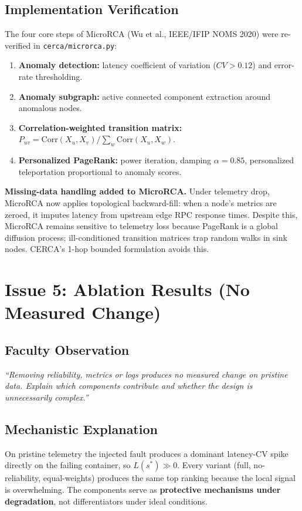 \documentclass[11pt,a4paper]{article}
\begin{document}
\subsection{Implementation Verification}
The four core steps of MicroRCA (Wu et al., IEEE/IFIP NOMS 2020) were re-verified in \texttt{cerca/microrca.py}:

\begin{enumerate}[leftmargin=1.8em,itemsep=2pt]
  \item \textbf{Anomaly detection:} latency coefficient of variation ($CV>0.12$) and error-rate thresholding.
  \item \textbf{Anomaly subgraph:} active connected component extraction around anomalous nodes.
  \item \textbf{Correlation-weighted transition matrix:} $P_{uv}=\mathrm{Corr}(X_u,X_v)/\sum_w\mathrm{Corr}(X_u,X_w)$.
  \item \textbf{Personalized PageRank:} power iteration, damping $\alpha=0.85$, personalized teleportation proportional to anomaly scores.
\end{enumerate}

\textbf{Missing-data handling added to MicroRCA.} Under telemetry drop, MicroRCA now applies topological backward-fill: when a node's metrics are zeroed, it imputes latency from upstream edge RPC response times. Despite this, MicroRCA remains sensitive to telemetry loss because PageRank is a global diffusion process; ill-conditioned transition matrices trap random walks in sink nodes. CERCA's 1-hop bounded formulation avoids this.

\section{Issue 5: Ablation Results (No Measured Change)}

\subsection{Faculty Observation}
\textit{``Removing reliability, metrics or logs produces no measured change on pristine data. Explain which components contribute and whether the design is unnecessarily complex.''}

\subsection{Mechanistic Explanation}
On pristine telemetry the injected fault produces a dominant latency-CV spike directly on the failing container, so $L(s^*)\gg0$. Every variant (full, no-reliability, equal-weights) produces the same top ranking because the local signal is overwhelming. The components serve as \textbf{protective mechanisms under degradation}, not differentiators under ideal conditions.
\end{document}
